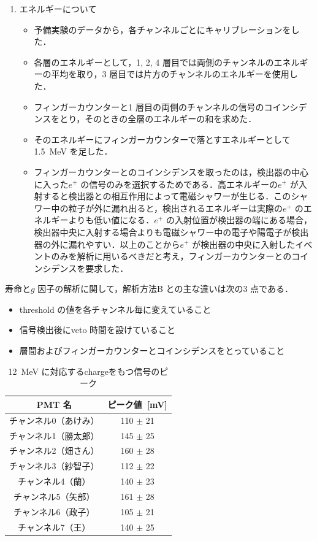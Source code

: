 \begin{enumerate}
\begin{itemize}
\end{itemize}
\item エネルギーについて
\begin{itemize}
\item 予備実験のデータから，各チャンネルごとにキャリブレーションをした．
\item 各層のエネルギーとして，1, 2, 4 層目では両側のチャンネルのエネルギーの平均を取り，3 層目では片方のチャンネルのエネルギーを使用した．
\item フィンガーカウンターと1 層目の両側のチャンネルの信号のコインシデンスをとり，そのときの全層のエネルギーの和を求めた．
\item そのエネルギーにフィンガーカウンターで落とすエネルギーとして1.5~MeV を足した．
\item フィンガーカウンターとのコインシデンスを取ったのは，検出器の中心に入った$e^{+}$ の信号のみを選択するためである．高エネルギーの$e^{+}$ が入射すると検出器との相互作用によって電磁シャワーが生じる．このシャワー中の粒子が外に漏れ出ると，検出されるエネルギーは実際の$e^{+}$ のエネルギーよりも低い値になる．$e^{+}$ の入射位置が検出器の端にある場合，検出器中央に入射する場合よりも電磁シャワー中の電子や陽電子が検出器の外に漏れやすい．以上のことから$e^{+}$ が検出器の中央に入射したイベントのみを解析に用いるべきだと考え，フィンガーカウンターとのコインシデンスを要求した．
\end{itemize}
\end{enumerate}

寿命と$g$ 因子の解析に関して，解析方法B との主な違いは次の3 点である．
\begin{itemize}
\item threshold の値を各チャンネル毎に変えていること
\item 信号検出後にveto 時間を設けていること
\item 層間およびフィンガーカウンターとコインシデンスをとっていること
\end{itemize}
  
\begin{table}[h]
\caption{12~MeV に対応するchargeをもつ信号のピーク}
\label{12MeVpeak}
\centering
\begin{tabular}{cc}\toprule
PMT 名&ピーク値~[mV] \\ \hline
チャンネル0（あけみ） & 110 $\pm$ 21 \\
チャンネル1（勝太郎） & 145 $\pm$ 25 \\
チャンネル2（畑さん） & 160 $\pm$ 28 \\
チャンネル3（紗智子） & 112 $\pm$ 22 \\
チャンネル4（蘭） & 140 $\pm$ 23 \\
チャンネル5（矢部） & 161 $\pm$ 28 \\
チャンネル6（政子） & 105 $\pm$ 21 \\
チャンネル7（王） & 140 $\pm$ 25 \\ \bottomrule
\end{tabular}
\end{table}

